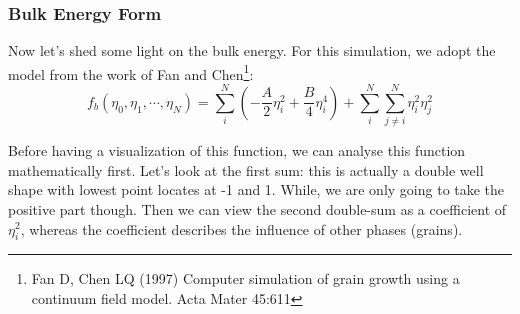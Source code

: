 \documentclass[compress,xcolor={dvipsnames}]{beamer}
\begin{document}
\begin{frame}
    \frametitle{Bulk Energy Form}

    Now let's shed some light on the bulk energy. For this simulation, we adopt the model from the work of Fan and Chen\footnote{Fan D, Chen LQ (1997) Computer simulation of grain growth using a continuum field model. Acta Mater 45:611}:\vspace{-7pt}
    \[
        f_b(\eta_0,\eta_1, \cdots, \eta_N) = \sum_{i}^{N}\left( -\frac{A}{2}\eta_i^2 + \frac{B}{4}\eta_i^4 \right) + \sum_{i}^{N}\sum_{j\neq{}i}^{N}\eta_i^2\eta_j^2
    \]
    \vspace{-7pt}

    Before having a visualization of this function, we can analyse this function mathematically first. Let's look at the first sum: this is actually a double well shape with lowest point locates at -1 and 1. While, we are only going to take the positive part though. Then we can view the second double-sum as a coefficient of \(\eta_i^2\), whereas the coefficient describes the influence of other phases (grains).

\end{frame}
\end{document}
